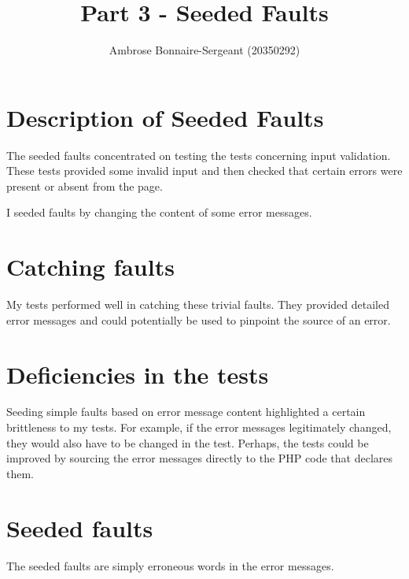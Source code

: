 \documentclass{article}
\title{Part 3 - Seeded Faults}
\author{Ambrose Bonnaire-Sergeant (20350292)}
\begin{document}
\maketitle

\section{Description of Seeded Faults}

The seeded faults concentrated on testing the tests concerning
input validation. These tests provided some invalid input
and then checked that certain errors were present or absent from the page.

I seeded faults by changing the content of some error messages.

\section{Catching faults}

My tests performed well in catching these trivial faults. They provided
detailed error messages and could potentially be used to pinpoint the source
of an error.

\section{Deficiencies in the tests}

Seeding simple faults based on error message content highlighted a certain
brittleness to my tests. For example, if the error messages legitimately changed,
they would also have to be changed in the test. Perhaps, the tests could be
improved by sourcing the error messages directly to the PHP code that declares them.

\section{Seeded faults}

The seeded faults are simply erroneous words in the error messages.
\end{document}
